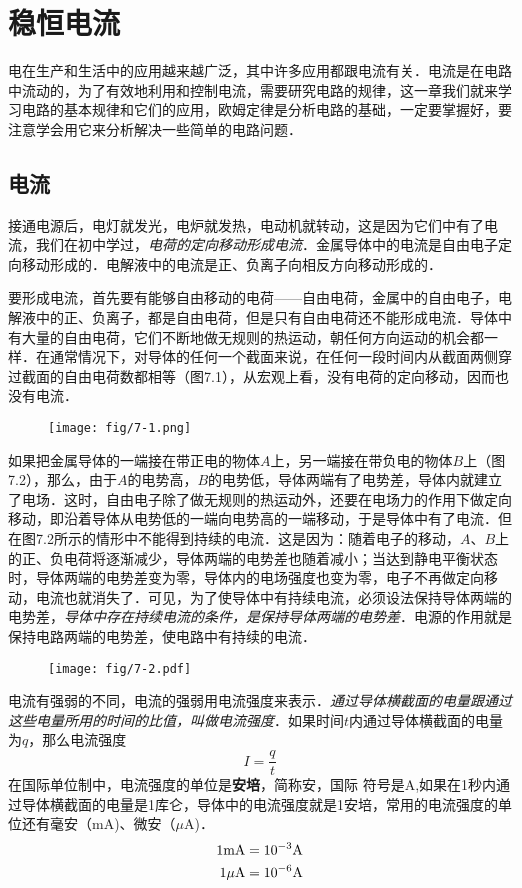 

\chapter{稳恒电流}
电在生产和生活中的应用越来越广泛，其中许多应用都跟电流有关．电流是在电路中流动的，为了有效地利用和控制电流，需要研究电路的规律，这一章我们就来学习电路的基本规律和它们的应用，欧姆定律是分析电路的基础，一定要掌握好，要注意学会用它来分析解决一些简单的电路问题．

\section{电流}
接通电源后，电灯就发光，电炉就发热，电动机就转动，这是因为它们中有了电流，我们在初中学过，\textit{电荷的定向移动形成电流}．金属导体中的电流是自由电子定向移动形成的．电解液中的电流是正、负离子向相反方向移动形成的．

要形成电流，首先要有能够自由移动的电荷——自由电荷，金属中的自由电子，电解液中的正、负离子，都是自由电荷，但是只有自由电荷还不能形成电流．导体中有大量的自由电荷，它们不断地做无规则的热运动，朝任何方向运动的机会都一样．在通常情况下，对导体的任何一个截面来说，在任何一段时间内从截面两侧穿过截面的自由电荷数都相等（图7.1），从宏观上看，没有电荷的定向移动，因而也没有电流．
\begin{figure}[htp]\centering
    \texttt{[image: fig/7-1.png]}
    \caption{} 
    \end{figure}

如果把金属导体的一端接在带正电的物体$A$上，另一端接在带负电的物体$B$上（图7.2），那么，由于$A$的电势高，$B$的电势低，导体两端有了电势差，导体内就建立了电场．这时，自由电子除了做无规则的热运动外，还要在电场力的作用下做定向移动，即沿着导体从电势低的一端向电势高的一端移动，于是导体中有了电流．但在图7.2所示的情形中不能得到持续的电流．这是因为：随着电子的移动，$A$、$B$上的正、负电荷将逐渐减少，导体两端的电势差也随着减小；当达到静电平衡状态时，导体两端的电势差变为零，导体内的电场强度也变为零，电子不再做定向移动，电流也就消失了．可见，为了使导体中有持续电流，必须设法保持导体两端的电势差，\textit{导体中存在持续电流的条件，是保持导体两端的电势差}．电源的作用就是保持电路两端的电势差，使电路中有持续的电流．
\begin{figure}[htp]\centering
\texttt{[image: fig/7-2.pdf]}
\caption{}
\end{figure}


电流有强弱的不同，电流的强弱用电流强度来表示．\textit{通过导体横截面的电量跟通过这些电量所用的时间的比值，叫做电流强度}．如果时间$t$内通过导体横截面的电量为$q$，那么电流强度
\[I=\frac{q}{t} \]
在国际单位制中，电流强度的单位是\textbf{安培}，简称安，国际
符号是A,如果在1秒内通过导体横截面的电量是1库仑，导体中的电流强度就是1安培，常用的电流强度的单位还有毫安（mA)、微安（$\mu$A)．
\[\begin{split}
    1{\rm mA}&= 10^{-3}{\rm A}\\
    1{\rm \mu A}&=10^{-6}{\rm A}
\end{split}\]

